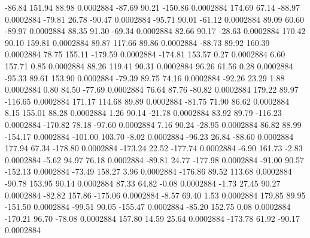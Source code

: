       -86.84      151.94       88.98     0.0002884
      -87.69       90.21     -150.86     0.0002884
      174.69       67.14      -88.97     0.0002884
      -79.81       26.78      -90.47     0.0002884
      -95.71       90.01      -61.12     0.0002884
       89.09       60.60      -89.97     0.0002884
       88.35       91.30      -69.34     0.0002884
       82.66       90.17      -28.63     0.0002884
      170.42       90.10      159.81     0.0002884
       89.87      117.66       89.86     0.0002884
      -88.73       89.92      160.39     0.0002884
       78.75      155.11     -179.59     0.0002884
     -174.81      153.57        0.27     0.0002884
        6.60      157.71        0.85     0.0002884
       88.26      119.41       90.31     0.0002884
       96.26       61.56        0.28     0.0002884
      -95.33       89.61      153.90     0.0002884
      -79.39       89.75       74.16     0.0002884
      -92.26       23.29        1.88     0.0002884
        0.80       84.50      -77.69     0.0002884
       76.64       87.76      -80.82     0.0002884
      179.22       89.97     -116.65     0.0002884
      171.17      114.68       89.89     0.0002884
      -81.75       71.90       86.62     0.0002884
        8.15      155.01       88.28     0.0002884
        1.26       90.14      -21.78     0.0002884
       83.92       89.79     -116.23     0.0002884
     -170.82       78.18      -97.60     0.0002884
        7.16       90.24      -28.95     0.0002884
       86.82       88.99     -154.17     0.0002884
     -101.00      103.70       -8.02     0.0002884
      -96.23       26.84      -88.60     0.0002884
      177.94       67.34     -178.80     0.0002884
     -173.24       22.52     -177.74     0.0002884
       -6.90      161.73       -2.83     0.0002884
       -5.62       94.97       76.18     0.0002884
      -89.81       24.77     -177.98     0.0002884
      -91.00       90.57     -152.13     0.0002884
      -73.49      158.27        3.96     0.0002884
     -176.86       89.52      113.68     0.0002884
      -90.78      153.95       90.14     0.0002884
       87.33       64.82       -0.08     0.0002884
       -1.73       27.45       90.27     0.0002884
      -82.82      157.86     -175.06     0.0002884
       -8.57       69.40        1.53     0.0002884
      179.85       89.95     -151.50     0.0002884
      -99.51       90.05     -155.47     0.0002884
      -85.20      152.75        0.08     0.0002884
     -170.21       96.70      -78.08     0.0002884
      157.80       14.59       25.64     0.0002884
     -173.78       61.92      -90.17     0.0002884
